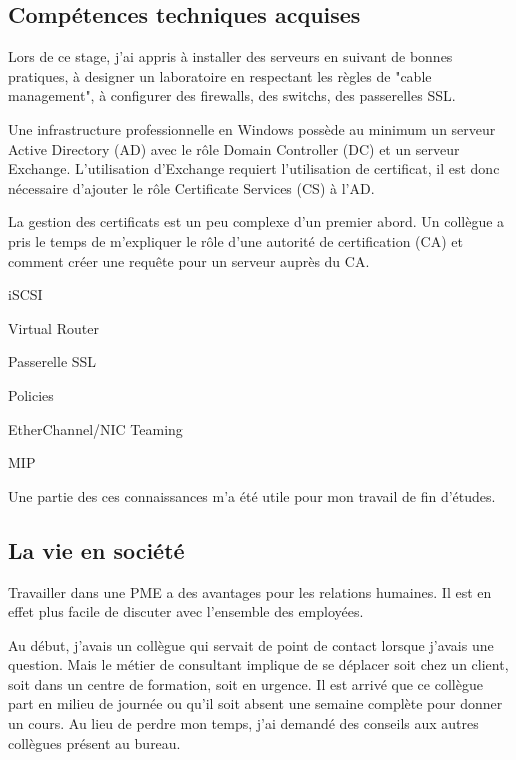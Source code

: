 \subsection{Compétences techniques acquises}
Lors de ce stage, j'ai appris à installer des serveurs en suivant de bonnes pratiques, à designer un laboratoire en respectant les règles de "cable management", à configurer des firewalls, des switchs, des passerelles SSL. 

Une infrastructure professionnelle en Windows possède au minimum un serveur Active Directory (AD) avec le rôle Domain Controller (DC) et un serveur Exchange. 
L'utilisation d'Exchange requiert l'utilisation de certificat, il est donc nécessaire d'ajouter le rôle Certificate Services (CS) à l'AD.

La gestion des certificats est un peu complexe d'un premier abord.
Un collègue a pris le temps de m'expliquer le rôle d'une autorité de certification (CA) et comment créer une requête pour un serveur auprès du CA. 

iSCSI

Virtual Router

Passerelle SSL 

Policies

EtherChannel/NIC Teaming

MIP


Une partie des ces connaissances m'a été utile pour mon travail de fin d'études. 
\subsection{La vie en société}
Travailler dans une PME a des avantages pour les relations humaines.
Il est en effet plus facile de discuter avec l'ensemble des employées.

Au début, j'avais un collègue qui servait de point de contact lorsque j'avais une question.
Mais le métier de consultant implique de se déplacer soit chez un client, soit dans un centre de formation, soit en urgence.
Il est arrivé que ce collègue part en milieu de journée ou qu'il soit absent une semaine complète pour donner un cours.
Au lieu de perdre mon temps, j'ai demandé des conseils aux autres collègues présent au bureau. 

